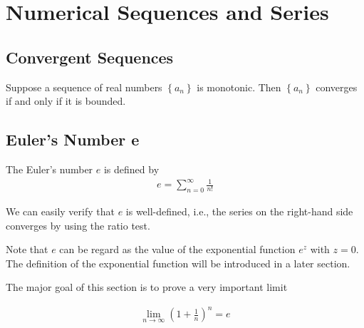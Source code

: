 \documentclass[thmcnt=section, 12pt]{elegantbook}
\begin{document}

\chapter{Numerical Sequences and Series}


\section{Convergent Sequences}


\begin{theorem} \label{thm:23}
    Suppose a sequence of real numbers $\left\{a_n\right\}$ is monotonic. Then $\left\{a_n\right\}$ converges if and only if it is bounded. 
\end{theorem}


\section{Euler's Number e}


\begin{definition}
    The Euler's number $e$ is defined by
    \begin{align*}
        e = \sum_{n=0}^{\infty} \frac{1}{n!}
    \end{align*}
\end{definition}

\begin{remark}
    We can easily verify that $e$ is well-defined, i.e., the series on the right-hand side converges by using the ratio test.
\end{remark}

\par Note that $e$ can be regard as the value of the exponential function $e^z$ with $z = 0$. The definition of the exponential function will be introduced in a later section.


\par The major goal of this section is to prove a very important limit 

\begin{align*}
    \lim_{n \to \infty} \left( 1 + \frac{1}{n} \right)^n = e
\end{align*}
\end{document}
